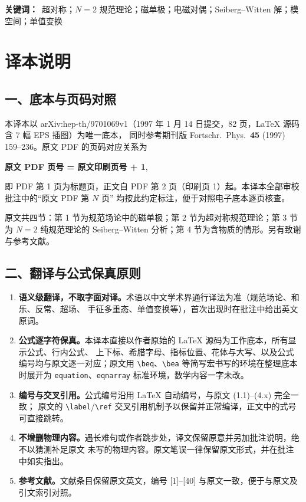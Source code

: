 \noindent\textbf{关键词：}\ 超对称；$N=2$ 规范理论；磁单极；电磁对偶；Seiberg--Witten 解；模空间；单值变换

\newpage

\section*{译本说明}

\subsection*{一、底本与页码对照}

本译本以 arXiv:hep-th/9701069v1（1997 年 1 月 14 日提交，82 页，LaTeX 源码含 7 幅 EPS 插图）为唯一底本，
同时参考期刊版 Fortschr.\ Phys.\ \textbf{45} (1997) 159--236。原文 PDF 的页码对应关系为
\begin{center}
\textbf{原文 PDF 页号 = 原文印刷页号 + 1},
\end{center}
即 PDF 第 1 页为标题页，正文自 PDF 第 2 页（印刷页 1）起。本译本全部审校批注中的“原文 PDF 第 $N$ 页”
均按此约定标注，便于对照电子底本逐页核查。

原文共四节：第 1 节为规范场论中的磁单极；第 2 节为超对称规范理论；第 3 节为 $N=2$ 纯规范理论的
Seiberg--Witten 分析；第 4 节为含物质的情形。另有致谢与参考文献。

\subsection*{二、翻译与公式保真原则}

\begin{enumerate}
  \item \textbf{语义级翻译，不取字面对译。}术语以中文学术界通行译法为准（规范场论、和乐、反常、超场、
        手征多重态、单值变换等），首次出现时在批注中给出英文原词。
  \item \textbf{公式逐字符保真。}本译本直接以作者原始的 LaTeX 源码为工作底本，所有显示公式、行内公式、
        上下标、希腊字母、指标位置、花体与大写、以及公式编号均与原文逐一对应；原文用
        \verb|\beq|、\verb|\bea| 等简写宏书写的环境在整理底本时展开为 \verb|equation|、\verb|eqnarray|
        标准环境，数学内容一字未改。
  \item \textbf{编号与交叉引用。}公式编号沿用 LaTeX 自动编号，与原文 (1.1)--(4.x) 完全一致；
        原文的 \verb|\label|/\verb|\ref| 交叉引用机制予以保留并正常编译，正文中的式号可直接跳转。
  \item \textbf{不增删物理内容。}遇长难句或作者跳步处，译文保留原意并另加批注说明，绝不以猜测补足原文
        未写的物理内容。原文笔误一律保留原文形式，并在批注中如实指出。
  \item \textbf{参考文献。}文献条目保留原文英文，编号 [1]--[40] 与原文一致，便于与原文及引文索引对照。
\end{enumerate}

